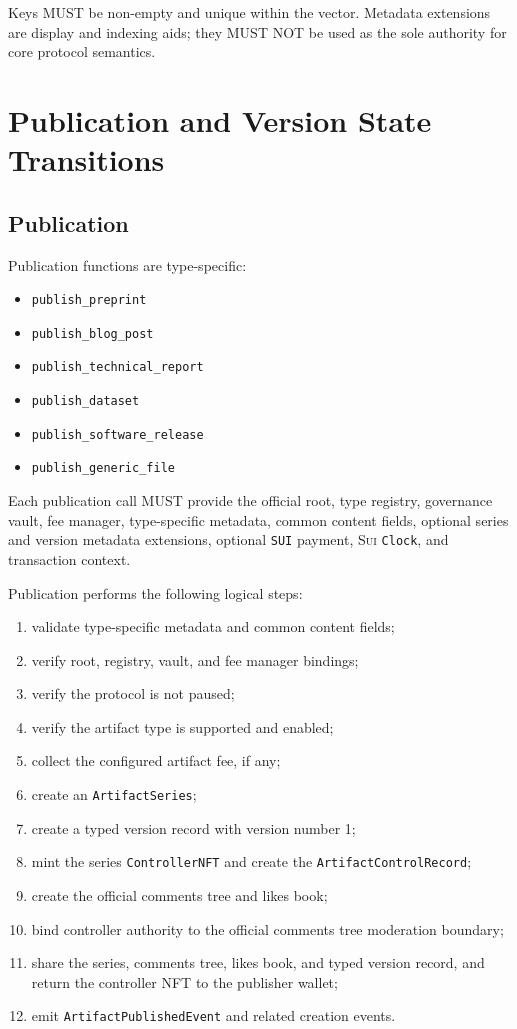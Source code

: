 \documentclass[11pt]{article}
\newcommand{\code}[1]{\texttt{#1}}
\newcommand{\sui}{\textsc{Sui}}
\begin{document}
Keys MUST be non-empty and unique within the vector. Metadata extensions are display and indexing aids; they MUST NOT be used as the sole authority for core protocol semantics.

\section{Publication and Version State Transitions}

\subsection{Publication}

Publication functions are type-specific:

\begin{itemize}[leftmargin=*]
  \item \code{publish\_preprint}
  \item \code{publish\_blog\_post}
  \item \code{publish\_technical\_report}
  \item \code{publish\_dataset}
  \item \code{publish\_software\_release}
  \item \code{publish\_generic\_file}
\end{itemize}

Each publication call MUST provide the official root, type registry, governance vault, fee manager, type-specific metadata, common content fields, optional series and version metadata extensions, optional \code{SUI} payment, \sui{} \code{Clock}, and transaction context.

Publication performs the following logical steps:

\begin{enumerate}[leftmargin=*]
  \item validate type-specific metadata and common content fields;
  \item verify root, registry, vault, and fee manager bindings;
  \item verify the protocol is not paused;
  \item verify the artifact type is supported and enabled;
  \item collect the configured artifact fee, if any;
  \item create an \code{ArtifactSeries};
  \item create a typed version record with version number 1;
  \item mint the series \code{ControllerNFT} and create the \code{ArtifactControlRecord};
  \item create the official comments tree and likes book;
  \item bind controller authority to the official comments tree moderation boundary;
  \item share the series, comments tree, likes book, and typed version record, and return the controller NFT to the publisher wallet;
  \item emit \code{ArtifactPublishedEvent} and related creation events.
\end{enumerate}
\end{document}
